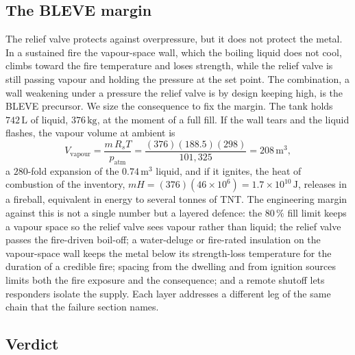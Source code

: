 \subsection{The BLEVE margin}

The relief valve protects against overpressure, but it does not protect
the metal. In a sustained fire the vapour-space wall, which the boiling
liquid does not cool, climbs toward the fire temperature and loses
strength, while the relief valve is still passing vapour and holding the
pressure at the set point. The combination, a wall weakening under a
pressure the relief valve is by design keeping high, is the BLEVE
precursor. We size the consequence to fix the margin. The tank holds
$742\,\text{L}$ of liquid, $376\,\text{kg}$, at the moment of a full
fill. If the wall tears and the liquid flashes, the vapour volume at
ambient is
\[
V_{\text{vapour}} = \frac{m\, R_s T}{p_{\text{atm}}} = \frac{(376)(188.5)
(298)}{101{,}325} = 208\,\text{m}^3,
\]
a $280$-fold expansion of the $0.74\,\text{m}^3$ liquid, and if it
ignites, the heat of combustion of the inventory, $m H = (376)(46\times
10^6) = 1.7\times 10^{10}\,\text{J}$, releases in a fireball, equivalent
in energy to several tonnes of TNT. The engineering margin against this
is not a single number but a layered defence: the $80\,\%$ fill limit
keeps a vapour space so the relief valve sees vapour rather than liquid;
the relief valve passes the fire-driven boil-off; a water-deluge or
fire-rated insulation on the vapour-space wall keeps the metal below its
strength-loss temperature for the duration of a credible fire; spacing
from the dwelling and from ignition sources limits both the fire exposure
and the consequence; and a remote shutoff lets responders isolate the
supply. Each layer addresses a different leg of the same chain that the
failure section names.

\subsection{Verdict}

